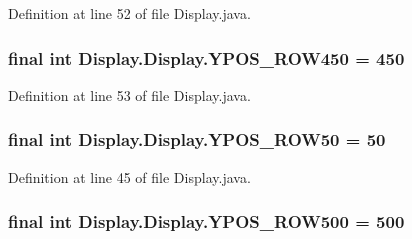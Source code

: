 Definition at line 52 of file Display.\+java.

\hypertarget{class_display_1_1_display_a68978a2870b55dbd8b5ab6d93db2ed79}{}
\subsubsection[{Y\+P\+O\+S\+\_\+\+R\+O\+W450}]{\setlength{\rightskip}{0pt plus 5cm}final int Display.\+Display.\+Y\+P\+O\+S\+\_\+\+R\+O\+W450 = 450\hspace{0.3cm}{\ttfamily [static]}}\label{class_display_1_1_display_a68978a2870b55dbd8b5ab6d93db2ed79}


Definition at line 53 of file Display.\+java.

\hypertarget{class_display_1_1_display_abfcff615e1843cea5f5f5236f7270469}{}
\subsubsection[{Y\+P\+O\+S\+\_\+\+R\+O\+W50}]{\setlength{\rightskip}{0pt plus 5cm}final int Display.\+Display.\+Y\+P\+O\+S\+\_\+\+R\+O\+W50 = 50\hspace{0.3cm}{\ttfamily [static]}}\label{class_display_1_1_display_abfcff615e1843cea5f5f5236f7270469}


Definition at line 45 of file Display.\+java.

\hypertarget{class_display_1_1_display_af69167585902297bf72bccb89eac59ad}{}
\subsubsection[{Y\+P\+O\+S\+\_\+\+R\+O\+W500}]{\setlength{\rightskip}{0pt plus 5cm}final int Display.\+Display.\+Y\+P\+O\+S\+\_\+\+R\+O\+W500 = 500\hspace{0.3cm}{\ttfamily [static]}}\label{class_display_1_1_display_af69167585902297bf72bccb89eac59ad}



